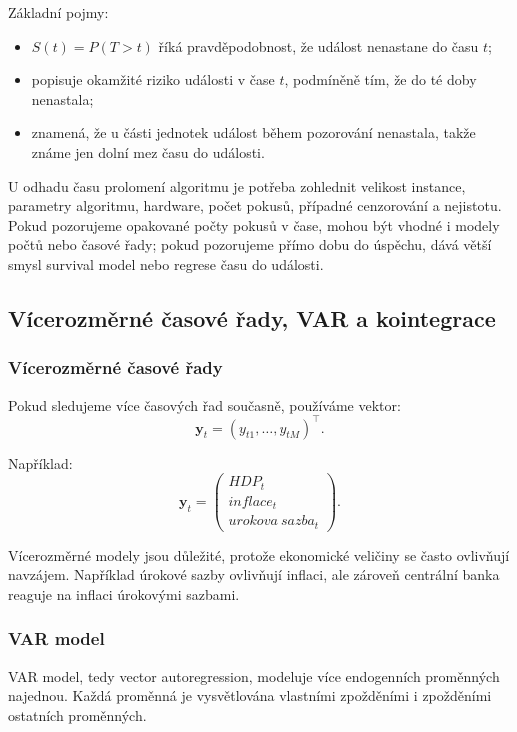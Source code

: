 Základní pojmy:
\begin{itemize}
    \item {} \(S(t)=P(T>t)\) říká pravděpodobnost, že událost nenastane do času \(t\);
    \item {} popisuje okamžité riziko události v čase \(t\), podmíněně tím, že do té doby
    nenastala;
    \item {} znamená, že u části jednotek událost během pozorování nenastala, takže
    známe jen dolní mez času do události.
\end{itemize}

U odhadu času prolomení algoritmu je potřeba zohlednit velikost instance, parametry algoritmu, hardware,
počet pokusů, případné cenzorování a nejistotu. Pokud pozorujeme opakované počty pokusů v čase, mohou
být vhodné i modely počtů nebo časové řady; pokud pozorujeme přímo dobu do úspěchu, dává větší smysl
survival model nebo regrese času do události.

\subsection{Vícerozměrné časové řady, VAR a kointegrace}

\subsubsection{Vícerozměrné časové řady}

Pokud sledujeme více časových řad současně, používáme vektor:
\[
    \mathbf y_t=(y_{t1},\dots,y_{tM})^\top.
\]

Například:
\[
    \mathbf y_t =
    \begin{pmatrix}
    HDP_t\\
    inflace_t\\
    urokova\ sazba_t
    \end{pmatrix}.
\]

Vícerozměrné modely jsou důležité, protože ekonomické veličiny se často ovlivňují navzájem.
Například úrokové sazby ovlivňují inflaci, ale zároveň centrální banka reaguje na inflaci úrokovými sazbami.

\subsubsection{VAR model}

VAR model, tedy vector autoregression, modeluje více endogenních proměnných najednou.
Každá proměnná je vysvětlována vlastními zpožděními i zpožděními ostatních proměnných.

